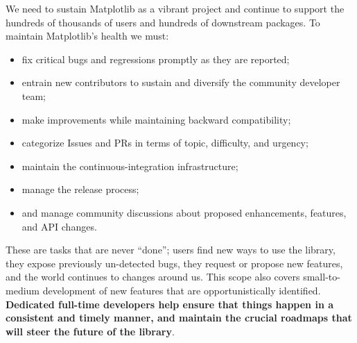 \documentclass[12pt]{article}
\numberwithin{page}{section}
\begin{document}
We need to sustain Matplotlib as a vibrant project and continue to support the
hundreds of thousands of users and hundreds of downstream packages.  To maintain
Matplotlib's health we must:
\begin{itemize}[noitemsep]
\item fix critical bugs and regressions promptly as they are reported;
\item entrain new contributors to sustain and diversify the community
  developer team;
\item make improvements while maintaining backward compatibility;
\item categorize Issues and PRs in terms of topic, difficulty, and
  urgency;
\item maintain the continuous-integration infrastructure;
\item manage the release process;
\item and manage community discussions about proposed enhancements, features,
  and API changes.
\end{itemize}
These are tasks that are never ``done''; users find new ways to use the
library, they expose previously un-detected bugs, they request or propose new
features, and the world continues to changes around us.  This scope also covers
small-to-medium development of new features that are opportunistically
identified.  \textbf{Dedicated full-time developers help ensure that things
  happen in a consistent and timely manner, and maintain the crucial roadmaps
  that will steer the future of the library}.



\end{document}
